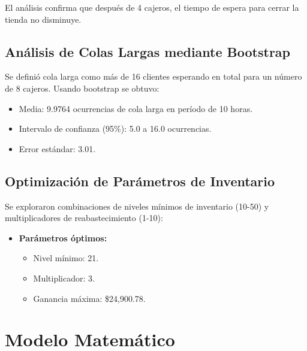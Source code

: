\documentclass[12pt, a4paper]{article}
\begin{document}
El análisis confirma que después de 4 cajeros, el tiempo de espera para cerrar la tienda no disminuye.

\subsection{Análisis de Colas Largas mediante Bootstrap}
Se definió cola larga como más de 16 clientes esperando en total para un número de 8 cajeros. Usando bootstrap se obtuvo:
\begin{itemize}
    \item Media: 9.9764 ocurrencias de cola larga en período de 10 horas.
    \item Intervalo de confianza (95\%): 5.0 a 16.0 ocurrencias.
    \item Error estándar: 3.01.
\end{itemize}

\subsection{Optimización de Parámetros de Inventario}
Se exploraron combinaciones de niveles mínimos de inventario (10-50) y multiplicadores de reabastecimiento (1-10):
\begin{itemize}
    \item \textbf{Parámetros óptimos:}
    \begin{itemize}
        \item Nivel mínimo: 21.
        \item Multiplicador: 3.
        \item Ganancia máxima: \$24,900.78.
    \end{itemize}
\end{itemize}

\section{Modelo Matemático}
\end{document}
